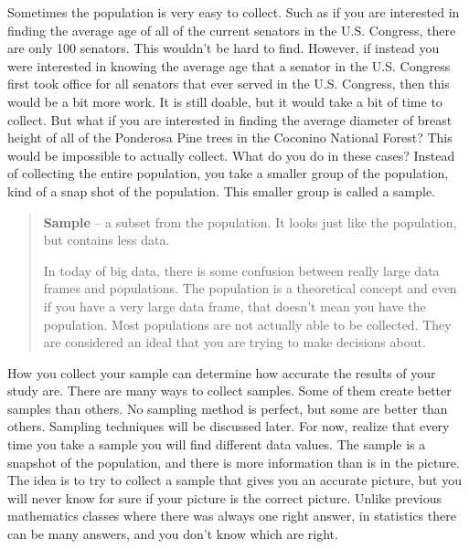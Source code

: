 \documentclass[]{book}
\begin{document}
Sometimes the population is very easy to collect. Such as if you are interested in finding the average age of all of the current senators in the U.S. Congress, there are only 100 senators. This wouldn't be hard to find. However, if instead you were interested in knowing the average age that a senator in the U.S. Congress first took office for all senators that ever served in the U.S. Congress, then this would be a bit more work. It is still doable, but it would take a bit of time to collect. But what if you are interested in finding the average diameter of breast height of all of the Ponderosa Pine trees in the Coconino National Forest? This would be impossible to actually collect. What do you do in these cases? Instead of collecting the entire population, you take a smaller group of the population, kind of a snap shot of the population. This smaller group is called a sample.

\begin{quote}
\textbf{Sample} -- a subset from the population. It looks just like the population, but contains less data.

In today of big data, there is some confusion between really large data frames and populations. The population is a theoretical concept and even if you have a very large data frame, that doesn't mean you have the population. Most populations are not actually able to be collected. They are considered an ideal that you are trying to make decisions about.
\end{quote}

How you collect your sample can determine how accurate the results of your study are. There are many ways to collect samples. Some of them create better samples than others. No sampling method is perfect, but some are better than others. Sampling techniques will be discussed later. For now, realize that every time you take a sample you will find different data values. The sample is a snapshot of the population, and there is more information than is in the picture. The idea is to try to collect a sample that gives you an accurate picture, but you will never know for sure if your picture is the correct picture. Unlike previous mathematics classes where there was always one right answer, in statistics there can be many answers, and you don't know which are right.
\end{document}
